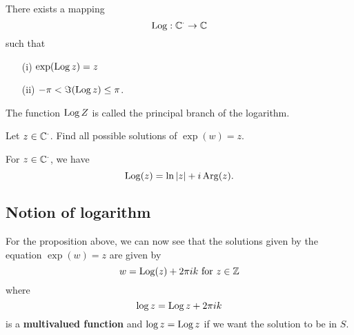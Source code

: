\documentclass[a4paper]{report}
\begin{document}
\begin{theorem}[ ]
    There exists a mapping 
    \[  \operatorname{Log}: \mathbb{C}^{\cdot} \to \mathbb{C}  \] such that 
    \begin{enumerate}
        \item[(i)] \( \exp(\operatorname{Log} z) = z  \)
        \item[(ii)] \( - \pi < \Im(\operatorname{Log} z) \leq \pi \).
    \end{enumerate}
\end{theorem}

\begin{definition}
    The function \( \operatorname{Log} Z  \) is called the principal branch of the logarithm. 
\end{definition}

\begin{prop}
    Let \( z \in \mathbb{C}^{\cdot} \). Find all possible solutions of \( \exp(w) = z  \).
\end{prop}

\begin{lemma}
   For \( z \in \mathbb{C}^{\cdot} \), we have  
   \[  \operatorname{Log}(z) = \ln | z |  + i \operatorname{Arg}(z). \]
\end{lemma}

\subsection{Notion of logarithm}
For the proposition above, we can now see that the solutions given by the equation \( \exp(w) = z  \) are given by
\[  w = \Log(z) + 2 \pi i k  \ \text{for} \ z \in \Z   \]
where 
\[  \log z = \operatorname{Log} z + 2\pi i k  \]
is a \textbf{multivalued function} and \( \log z = \operatorname{Log} z  \) if we want the solution to be in \( S  \).
\end{document}
